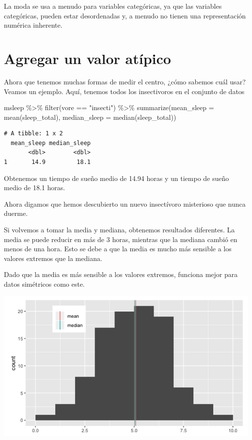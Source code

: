 \documentclass[
  letterpaper,
  DIV=11,
  numbers=noendperiod]{scrreprt}
\newenvironment{Shaded}{\begin{snugshade}}{\end{snugshade}}
\newcommand{\AttributeTok}[1]{\textcolor[rgb]{0.40,0.45,0.13}{#1}}
\newcommand{\FunctionTok}[1]{\textcolor[rgb]{0.28,0.35,0.67}{#1}}
\newcommand{\NormalTok}[1]{\textcolor[rgb]{0.00,0.23,0.31}{#1}}
\newcommand{\SpecialCharTok}[1]{\textcolor[rgb]{0.37,0.37,0.37}{#1}}
\newcommand{\StringTok}[1]{\textcolor[rgb]{0.13,0.47,0.30}{#1}}
\begin{document}
La moda se usa a menudo para variables categóricas, ya que las variables
categóricas, pueden estar desordenadas y, a menudo no tienen una
representación numérica inherente.

\hypertarget{agregar-un-valor-atuxedpico}{%
\section{Agregar un valor atípico}\label{agregar-un-valor-atuxedpico}}

Ahora que tenemos muchas formas de medir el centro, ¿cómo sabemos cuál
usar? Veamos un ejemplo. Aquí, tenemos todos los insectivoros en el
conjunto de datos

\begin{Shaded}
\begin{Highlighting}[]
\NormalTok{msleep }\SpecialCharTok{\%\textgreater{}\%} 
  \FunctionTok{filter}\NormalTok{(vore }\SpecialCharTok{==} \StringTok{"insecti"}\NormalTok{) }\SpecialCharTok{\%\textgreater{}\%} 
  \FunctionTok{summarize}\NormalTok{(}\AttributeTok{mean\_sleep =} \FunctionTok{mean}\NormalTok{(sleep\_total),}
            \AttributeTok{median\_sleep =} \FunctionTok{median}\NormalTok{(sleep\_total))}
\end{Highlighting}
\end{Shaded}

\begin{verbatim}
# A tibble: 1 x 2
  mean_sleep median_sleep
       <dbl>        <dbl>
1       14.9         18.1
\end{verbatim}

Obtenemos un tiempo de sueño medio de 14.94 horas y un tiempo de sueño
medio de 18.1 horas.

Ahora digamos que hemos descubierto un nuevo insectívoro misterioso que
nunca duerme.

Si volvemos a tomar la media y mediana, obtenemos resultados diferentes.
La media se puede reducir en más de 3 horas, mientras que la mediana
cambió en menos de una hora. Esto se debe a que la media es mucho más
sensible a los valores extremos que la mediana.

Dado que la media es más sensible a los valores extremos, funciona mejor
para datos simétricos como este.

\includegraphics{fig4.png}
\end{document}
